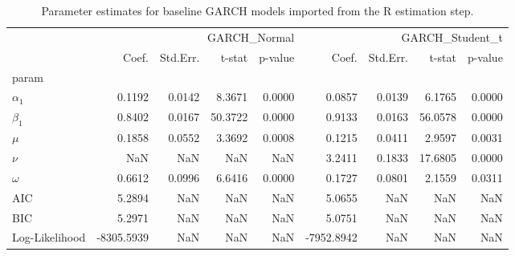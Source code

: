 \begin{table}
\caption{Parameter estimates for baseline GARCH models imported from the R estimation step.}
\label{tab:garch_params}
\begin{tabular}{lrrrrrrrr}
\toprule
 & \multicolumn{4}{r}{GARCH_Normal} & \multicolumn{4}{r}{GARCH_Student_t} \\
 & Coef. & Std.Err. & t-stat & p-value & Coef. & Std.Err. & t-stat & p-value \\
param &  &  &  &  &  &  &  &  \\
\midrule
$\alpha_1$ & 0.1192 & 0.0142 & 8.3671 & 0.0000 & 0.0857 & 0.0139 & 6.1765 & 0.0000 \\
$\beta_1$ & 0.8402 & 0.0167 & 50.3722 & 0.0000 & 0.9133 & 0.0163 & 56.0578 & 0.0000 \\
$\mu$ & 0.1858 & 0.0552 & 3.3692 & 0.0008 & 0.1215 & 0.0411 & 2.9597 & 0.0031 \\
$\nu$ & NaN & NaN & NaN & NaN & 3.2411 & 0.1833 & 17.6805 & 0.0000 \\
$\omega$ & 0.6612 & 0.0996 & 6.6416 & 0.0000 & 0.1727 & 0.0801 & 2.1559 & 0.0311 \\
AIC & 5.2894 & NaN & NaN & NaN & 5.0655 & NaN & NaN & NaN \\
BIC & 5.2971 & NaN & NaN & NaN & 5.0751 & NaN & NaN & NaN \\
Log-Likelihood & -8305.5939 & NaN & NaN & NaN & -7952.8942 & NaN & NaN & NaN \\
\bottomrule
\end{tabular}
\end{table}

